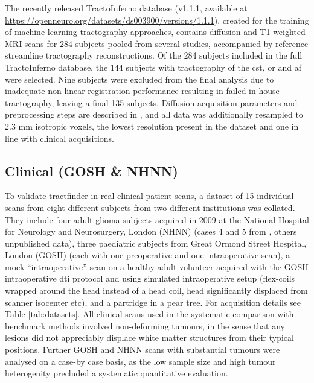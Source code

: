 The recently released TractoInferno database (v1.1.1, available at \url{https://openneuro.org/datasets/ds003900/versions/1.1.1}),\autocite{Poulin2022} created for the training of machine learning tractography approaches, contains diffusion and T1-weighted MRI scans for 284 subjects pooled from several studies, accompanied by reference streamline tractography reconstructions.
Of the 284 subjects included in the full TractoInferno database, the 144 subjects with tractography of the \gls{cst}, \gls{or} and \gls{af} were selected.
Nine subjects were excluded from the final analysis due to inadequate non-linear registration performance resulting in failed in-house tractography, leaving a final 135 subjects.
Diffusion acquisition parameters and preprocessing steps are described in \textcite{Poulin2022}, and all data was additionally resampled to 2.3 mm isotropic voxels, the lowest resolution present in the dataset and one in line with clinical acquisitions.

\subsection{Clinical (GOSH \& NHNN)}

To validate tractfinder in real clinical patient scans, a dataset of 15 individual scans from eight different subjects from two different institutions was collated.
They include four adult glioma subjects acquired in 2009 at the National Hospital for Neurology and Neurosurgery, London (NHNN) (cases 4 and 5 from \textcite{Mancini2022}, others unpublished data),
three paediatric subjects from Great Ormond Street Hospital, London (GOSH) (each with one preoperative and one intraoperative scan),
a mock “intraoperative” scan on a healthy adult volunteer acquired with the GOSH intraoperative \gls{dti} protocol and using simulated intraoperative setup (flex-coils wrapped around the head instead of a head coil, head significantly displaced from scanner isocenter etc),
and a partridge in a pear tree.
For acquisition details see Table \ref{tab:datasets}.
All clinical scans used in the systematic comparison with benchmark methods involved non-deforming tumours, in the sense that any lesions did not appreciably displace white matter structures from their typical positions.
Further GOSH and NHNN scans with substantial tumours were analysed on a case-by case basis, as the low sample size and high tumour heterogenity precluded a systematic quantitative evaluation.

